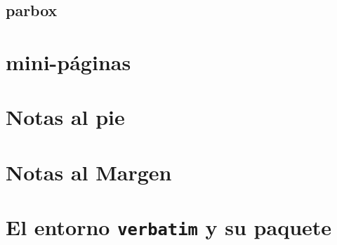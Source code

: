 \documentclass[12pt,aspectratio=43]{beamer}
\begin{document}
\subsection{parbox}

\section{mini-páginas}

\section{Notas al pie}

\section{Notas al Margen}

\section{El entorno {\tt verbatim} y su paquete}
\end{document}
